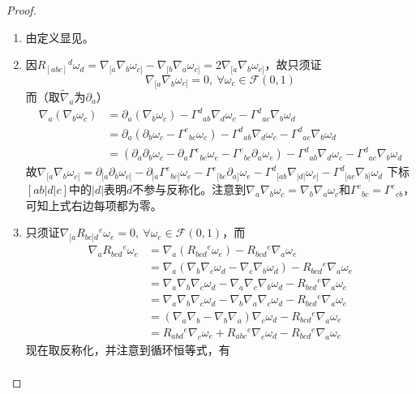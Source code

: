 \begin{proof}
\begin{enumerate}[（1）]
\item 由定义显见。
\item 因$R_{[abc]}{}^d\omega_d = \nabla_{[a}\nabla_b\omega_{c]} - \nabla_{[b}\nabla_a\omega_{c]} = 2\nabla_{[a}\nabla_b\omega_{c]}$，故只须证
$$\nabla_{[a}\nabla_b\omega_{c]} = 0, ~ \forall \omega_c \in \mathscr{F}(0, 1)$$
而（取$\tilde\nabla_a$为$\partial_a$）
$$\begin{aligned}
\nabla_a(\nabla_b\omega_c) & = \partial_a(\nabla_b\omega_c) - \Gamma^d{}_{ab}\nabla_d\omega_c - \Gamma^d{}_{ac}\nabla_b\omega_d \\
& = \partial_a(\partial_b\omega_c - \Gamma^e{}_{bc}\omega_e) - \Gamma^d{}_{ab}\nabla_d\omega_c - \Gamma^d{}_{ac}\nabla_b\omega_d \\
& = (\partial_a\partial_b\omega_c - \partial_a\Gamma^e{}_{bc}\omega_e - \Gamma^e{}_{bc}\partial_a\omega_e) - \Gamma^d{}_{ab}\nabla_d\omega_c - \Gamma^d{}_{ac}\nabla_b\omega_d
\end{aligned}$$
故$\nabla_{[a}\nabla_b\omega_{c]} = \partial_{[a}\partial_b\omega_{c]} - \partial_{[a}\Gamma^e{}_{bc]}\omega_e - \Gamma^e{}_{[bc}\partial_{a]}\omega_e - \Gamma^d{}_{[ab}\nabla_{|d|}\omega_{c]} - \Gamma^d{}_{[ac}\nabla_{b]}\omega_d$
下标$[ab|d|c]$中的$|d|$表明$d$不参与反称化。注意到$\nabla_a\nabla_b\omega_c = \nabla_b\nabla_a\omega_c$和$\Gamma^e{}_{bc} = \Gamma^e{}_{cb}$，可知上式右边每项都为零。
\item 只须证$\nabla_{[a}R_{bc]d}{}^e\omega_e = 0, ~ \forall \omega_e \in \mathscr{F}(0, 1)$，而
$$\begin{aligned}
\nabla_{a}R_{bcd}{}^e\omega_e & = \nabla_a(R_{bcd}{}^e\omega_e) - R_{bcd}{}^e\nabla_a\omega_e \\
& = \nabla_a(\nabla_b\nabla_c\omega_d - \nabla_c\nabla_b\omega_d) - R_{bcd}{}^e\nabla_a\omega_e \\
& = \nabla_a\nabla_b\nabla_c\omega_d - \nabla_a\nabla_c\nabla_b\omega_d - R_{bcd}{}^e\nabla_a\omega_e \\
& = \nabla_a\nabla_b\nabla_c\omega_d - \nabla_b\nabla_a\nabla_c\omega_d - R_{bcd}{}^e\nabla_a\omega_e \\
& = (\nabla_a\nabla_b - \nabla_b\nabla_a)\nabla_c\omega_d - R_{bcd}{}^e\nabla_a\omega_e \\
& = R_{abd}{}^e\nabla_c\omega_e + R_{abc}{}^e\nabla_e\omega_d - R_{bcd}{}^e\nabla_a\omega_e
\end{aligned}$$
现在取反称化，并注意到循环恒等式，有
$$\begin{aligned}

\end{aligned}$$
\end{enumerate}
\end{proof}
